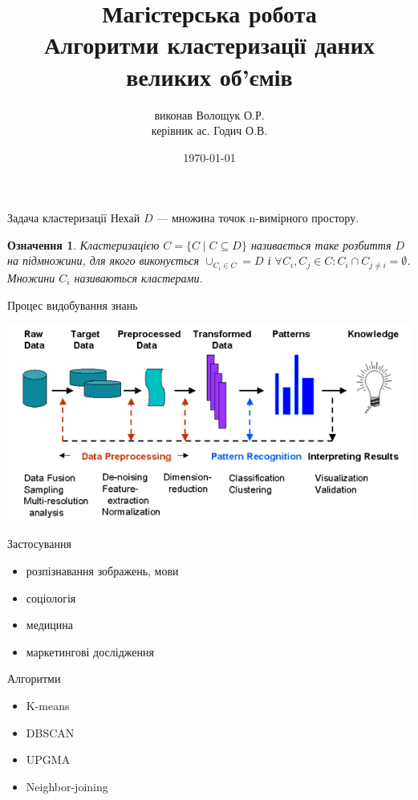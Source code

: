 \documentclass{beamer}
\title{Магістерська робота\\Алгоритми кластеризації даних великих об’ємів}
\author{виконав Волощук О.Р.\\керівник ас. Годич О.В.}
\date{\today}
\newtheorem{defn}{Означення}
\begin{document}
    \begin{frame}
        \maketitle
    \end{frame}

    \begin{frame}{Задача кластеризації}
        Нехай $D$ --- множина точок n-вимірного простору. 
        \begin{defn}
            \emph{Кластеризацією} $C = \{C \mid C \subseteq D\}$ називається таке розбиття $D$ на підмножини, 
            для якого виконується $\cup_{C_i \in C} = D$ і $\forall C_i, C_j \in C : C_i \cap C_{j \neq i} = \emptyset$. 
            Множини $C_i$ називаються кластерами.
        \end{defn}
    \end{frame}
    
    \begin{frame}{Процес видобування знань}
        \begin{center}
            \includegraphics[scale=0.5]{data_mining_steps.png}
        \end{center}
    \end{frame}    
    
    \begin{frame}{Застосування}
        \begin{itemize}
            \item розпізнавання зображень, мови
            \item соціологія
            \item медицина
            \item маркетингові дослідження
        \end{itemize}
    \end{frame}
    
    
    \begin{frame}{Алгоритми}
        \begin{itemize}
            \item K-means
            \item DBSCAN
            \item UPGMA
            \item Neighbor-joining
        \end{itemize}
    \end{frame}
    
\end{document}
